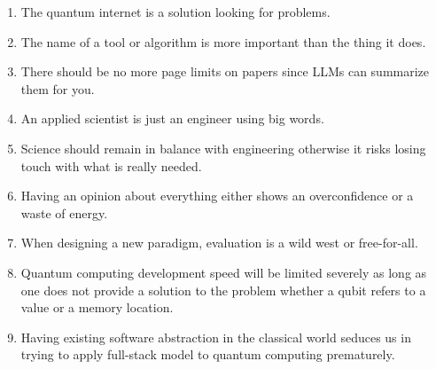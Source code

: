 \begin{enumerate}[widest=10]
  \item The quantum internet is a solution looking for problems.

  \item The name of a tool or algorithm is more important than the thing it does.

  \item There should be no more page limits on papers since LLMs can summarize them for you.

  \item An applied scientist is just an engineer using big words.


  \item Science should remain in balance with engineering otherwise it risks losing touch with what is really needed.

  \item Having an opinion about everything either shows an overconfidence or a waste of energy.

  \item When designing a new paradigm, evaluation is a wild west or free-for-all.


  \item Quantum computing development speed will be limited severely as long as one does not provide a solution to the problem whether a qubit refers to a value or a memory location.
  \item Having existing software abstraction in the classical world seduces us in trying to apply full-stack model to quantum computing prematurely.
  

\end{enumerate}
